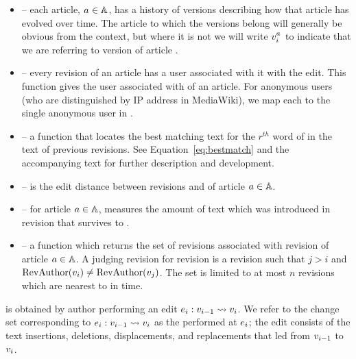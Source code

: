 \begin{itemize}
\item {} -- each article, $a_{} \in \mathbb{A}$,
    has a history of versions
    describing how that article has evolved over time.
    The article to which the versions belong will generally be
    obvious from the context, but where it is not we will
    write $v_{i}^{a_{}}$ to indicate that we
    are referring to version  of article \article{}.

\item {} -- every revision of an article has
    a user associated with it with the edit.
    This function gives the user associated with  of
    an article.
    For anonymous users (who are distinguished by IP address in
    MediaWiki), we map each to the single anonymous user in \users.

\item {} -- a function
    that locates the best matching text for the $r^{th}$ word of
     in the text of previous revisions.
    See Equation~\ref{eq:bestmatch} and the accompanying text
    for further description and development.

\item {} -- is the edit distance between revisions
     and  of article $a \in \mathbb{A}$.

\item {} -- for article $a \in \mathbb{A}$, measures the
    amount of text which was introduced in revision 
    that survives to .

\item {} -- a function which returns the set of
     revisions associated with revision 
    of article $a \in \mathbb{A}$.
    A judging revision for revision  is a revision 
    such that $j > i$ and
    $\mathrm{RevAuthor}(v_{i}) \not= \mathrm{RevAuthor}(v_{j})$.
    The set is limited to at most $n$ revisions which are nearest
    to  in time.

\end{itemize}
\renewcommand{\labelitemi}{$\bullet$}


is obtained by author  performing an
edit $e_{i}: v_{i-1} \rightsquigarrow v_{i}$.
We refer to the change set corresponding to
$e_{i}: v_{i-1} \rightsquigarrow v_{i}$
as the  performed at $e_{i}$; the edit consists of the text
insertions, deletions, displacements, and replacements that led from
$v_{i-1}$ to $v_{i}$.

